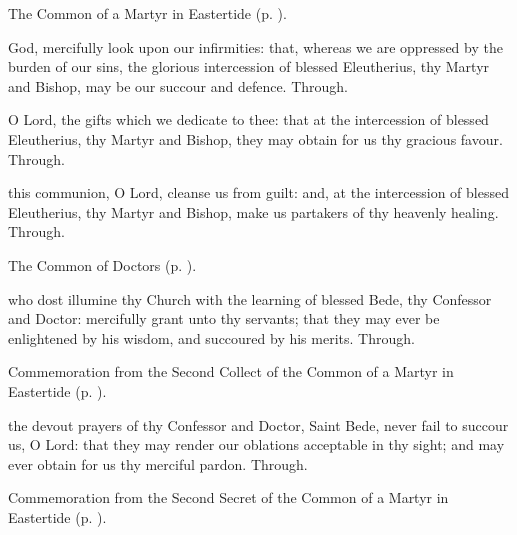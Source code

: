 
\begin{rubric}
	The Common of a Martyr in Eastertide (p. \pageref{CommonMartyrEaster}).
\end{rubric}

\collect\label{EleutheriusCollect}
 God, mercifully look upon our infirmities: that, whereas we are oppressed by the burden of our sins, the glorious intercession of blessed Eleutherius, thy Martyr and Bishop, may be our succour and defence. Through.

\secret\label{EleutheriusSecret}
 O Lord, the gifts which we dedicate to thee: that at the intercession of blessed Eleutherius, thy Martyr and Bishop, they may obtain for us thy gracious favour. Through.

\postcommunion\label{EleutheriusPostcommunion}
 this communion, O Lord, cleanse us from guilt: and, at the intercession of blessed Eleutherius, thy Martyr and Bishop, make us partakers of thy heavenly healing. Through.



\begin{rubric}
	The Common of Doctors (p. \pageref{CommonDoctors}).
\end{rubric}

\collect
{} who dost illumine thy Church with the learning of blessed Bede, thy Confessor and Doctor: mercifully grant unto thy servants; that they may ever be enlightened by his wisdom, and succoured by his merits. Through.

\begin{rubric}
	Commemoration  from the Second Collect of the Common of a Martyr in Eastertide (p. \pageref{CommonMartyrEaster}).
\end{rubric}

\secret
{} the devout prayers of thy Confessor and Doctor, Saint Bede, never fail to succour us, O Lord: that they may render our oblations acceptable in thy sight; and may ever obtain for us thy merciful pardon. Through.

\begin{rubric}
	Commemoration  from the Second Secret of the Common of a Martyr in Eastertide (p. \pageref{CommonMartyrEaster}).
\end{rubric}

